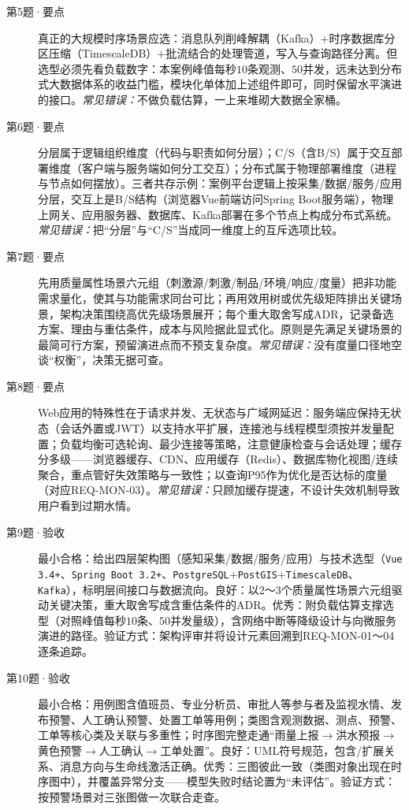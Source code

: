 \begin{description}
\item[第5题·要点] 真正的大规模时序场景应选：消息队列削峰解耦（Kafka）$+$时序数据库分区压缩（TimescaleDB）$+$批流结合的处理管道，写入与查询路径分离。但选型必须先看负载数字：本案例峰值每秒$10$条观测、$50$并发，远未达到分布式大数据体系的收益门槛，模块化单体加上述组件即可，同时保留水平演进的接口。\textit{常见错误：}不做负载估算，一上来堆砌大数据全家桶。
\item[第6题·要点] 分层属于逻辑组织维度（代码与职责如何分层）；C/S（含B/S）属于交互部署维度（客户端与服务端如何分工交互）；分布式属于物理部署维度（进程与节点如何摆放）。三者共存示例：案例平台逻辑上按采集/数据/服务/应用分层，交互上是B/S结构（浏览器Vue前端访问Spring Boot服务端），物理上网关、应用服务器、数据库、Kafka部署在多个节点上构成分布式系统。\textit{常见错误：}把“分层”与“C/S”当成同一维度上的互斥选项比较。
\item[第7题·要点] 先用质量属性场景六元组（刺激源/刺激/制品/环境/响应/度量）把非功能需求量化，使其与功能需求同台可比；再用效用树或优先级矩阵排出关键场景，架构决策围绕高优先级场景展开；每个重大取舍写成ADR，记录备选方案、理由与重估条件，成本与风险据此显式化。原则是先满足关键场景的最简可行方案，预留演进点而不预支复杂度。\textit{常见错误：}没有度量口径地空谈“权衡”，决策无据可查。
\item[第8题·要点] Web应用的特殊性在于请求并发、无状态与广域网延迟：服务端应保持无状态（会话外置或JWT）以支持水平扩展，连接池与线程模型须按并发量配置；负载均衡可选轮询、最少连接等策略，注意健康检查与会话处理；缓存分多级——浏览器缓存、CDN、应用缓存（Redis）、数据库物化视图/连续聚合，重点管好失效策略与一致性；以查询P95作为优化是否达标的度量（对应REQ-MON-03）。\textit{常见错误：}只顾加缓存提速，不设计失效机制导致用户看到过期水情。
\item[第9题·验收] 最小合格：给出四层架构图（感知采集/数据/服务/应用）与技术选型（\texttt{Vue 3.4+}、\texttt{Spring Boot 3.2+}、\texttt{PostgreSQL}$+$\texttt{PostGIS}$+$\texttt{TimescaleDB}、\texttt{Kafka}），标明层间接口与数据流向。良好：以2～3个质量属性场景六元组驱动关键决策，重大取舍写成含重估条件的ADR。优秀：附负载估算支撑选型（对照峰值每秒$10$条、$50$并发量级），含网络中断等降级设计与向微服务演进的路径。验证方式：架构评审并将设计元素回溯到REQ-MON-01～04逐条追踪。
\item[第10题·验收] 最小合格：用例图含值班员、专业分析员、审批人等参与者及监视水情、发布预警、人工确认预警、处置工单等用例；类图含观测数据、测点、预警、工单等核心类及关联与多重性；时序图完整走通“雨量上报$\rightarrow$洪水预报$\rightarrow$黄色预警$\rightarrow$人工确认$\rightarrow$工单处置”。良好：UML符号规范，包含/扩展关系、消息方向与生命线激活正确。优秀：三图彼此一致（类图对象出现在时序图中），并覆盖异常分支——模型失败时结论置为“未评估”。验证方式：按预警场景对三张图做一次联合走查。

\end{description}
